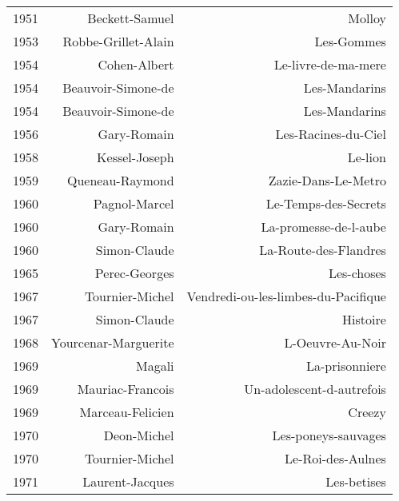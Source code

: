 \begin{xltabular}{\textwidth}{lrr}
1951 &                       Beckett-Samuel &                                Molloy \\
1953 &                  Robbe-Grillet-Alain &                            Les-Gommes \\
1954 &                         Cohen-Albert &                   Le-livre-de-ma-mere \\
1954 &                   Beauvoir-Simone-de &                         Les-Mandarins \\
1954 &                   Beauvoir-Simone-de &                         Les-Mandarins \\
1956 &                          Gary-Romain &                   Les-Racines-du-Ciel \\
1958 &                        Kessel-Joseph &                               Le-lion \\
1959 &                      Queneau-Raymond &                   Zazie-Dans-Le-Metro \\
1960 &                        Pagnol-Marcel &                  Le-Temps-des-Secrets \\
1960 &                          Gary-Romain &                 La-promesse-de-l-aube \\
1960 &                         Simon-Claude &                 La-Route-des-Flandres \\
1965 &                        Perec-Georges &                            Les-choses \\
1967 &                      Tournier-Michel &   Vendredi-ou-les-limbes-du-Pacifique \\
1967 &                         Simon-Claude &                              Histoire \\
1968 &                 Yourcenar-Marguerite &                      L-Oeuvre-Au-Noir \\
1969 &                               Magali &                        La-prisonniere \\
1969 &                     Mauriac-Francois &             Un-adolescent-d-autrefois \\
1969 &                     Marceau-Felicien &                                Creezy \\
1970 &                          Deon-Michel &                   Les-poneys-sauvages \\
1970 &                      Tournier-Michel &                     Le-Roi-des-Aulnes \\
1971 &                      Laurent-Jacques &                           Les-betises \\

\end{xltabular}
